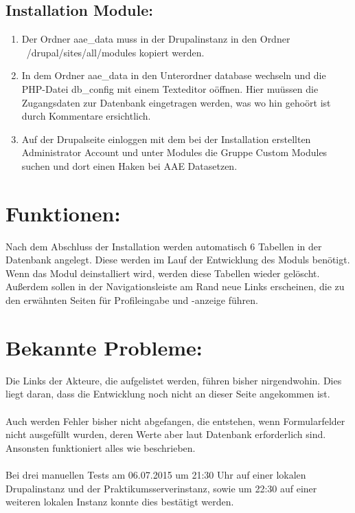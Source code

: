 \documentclass{swp}
\begin{document}
\subsection{Installation Module:}
\begin{enumerate}
\item Der Ordner \glqq aae\_{}data\grqq{} muss in der Drupalinstanz in den Ordner \glqq ~/drupal/sites/all/modules\grqq{} kopiert werden.
\item In dem Ordner \glqq aae\_{}data\grqq{} in den Unterordner \glqq database\grqq{} wechseln und die PHP-Datei \glqq db\_{}config\grqq{} mit einem Texteditor o\"offnen. Hier mu\"ussen die Zugangsdaten zur Datenbank eingetragen werden, was wo hin geho\"ort ist durch Kommentare ersichtlich.
\item Auf der Drupalseite einloggen mit dem bei der Installation erstellten Administrator Account und unter \glqq Modules\grqq{} die Gruppe \glqq Custom Modules\grqq{} suchen und dort einen Haken bei \glqq AAE Data\grqq setzen.
\end{enumerate}
\section{Funktionen:}
Nach dem Abschluss der Installation werden automatisch 6 Tabellen in der Datenbank angelegt. Diese werden im Lauf der Entwicklung des Moduls ben\"otigt. Wenn das Modul deinstalliert wird, werden diese Tabellen wieder gel\"oscht. Au{\ss}erdem sollen in der Navigationsleiste am Rand neue Links erscheinen, die zu den erw\"ahnten Seiten f\"ur Profileingabe und -anzeige f\"uhren.
\section{Bekannte Probleme:}
Die Links der Akteure, die aufgelistet werden, f\"uhren bisher nirgendwohin. Dies liegt daran, dass die Entwicklung noch nicht an dieser Seite angekommen ist.\\\\
Auch werden Fehler bisher nicht abgefangen, die entstehen, wenn Formularfelder nicht ausgef\"ullt wurden, deren Werte aber laut Datenbank erforderlich sind.
Ansonsten funktioniert alles wie beschrieben.\\\\
Bei drei manuellen Tests am 06.07.2015 um 21:30 Uhr auf einer lokalen Drupalinstanz und der Praktikumsserverinstanz, sowie um 22:30 auf einer weiteren lokalen Instanz  konnte dies best\"atigt werden.
\end{document}
